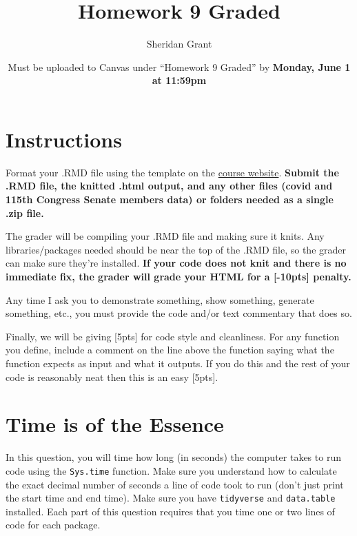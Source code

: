 \documentclass[12pt]{article}
\title{Homework 9 Graded}
\author{Sheridan Grant}
\date{Must be uploaded to Canvas under ``Homework 9 Graded'' by \textbf{Monday, June 1 at 11:59pm}}
\begin{document}
\sloppy

\maketitle

\section*{Instructions}

Format your .RMD file using the template on the \href{https://sheridanlgrant.github.io/teaching/STAT302_SPR2020}{course website}. \textbf{Submit the .RMD file, the knitted .html output, and any other files (covid and 115th Congress Senate members data) or folders needed as a single .zip file.}

The grader will be compiling your .RMD file and making sure it knits. Any libraries/packages needed should be near the top of the .RMD file, so the grader can make sure they're installed. \textbf{If your code does not knit and there is no immediate fix, the grader will grade your HTML for a [-10pts] penalty.}

Any time I ask you to demonstrate something, show something, generate something, etc., you must provide the code and/or text commentary that does so.

Finally, we will be giving [5pts] for code style and cleanliness. For any function you define, include a comment on the line above the function saying what the function expects as input and what it outputs. If you do this and the rest of your code is reasonably neat then this is an easy [5pts].

\section{Time is of the Essence}

In this question, you will time how long (in seconds) the computer takes to run code using the \verb|Sys.time| function. Make sure you understand how to calculate the exact decimal number of seconds a line of code took to run (don't just print the start time and end time). Make sure you have \verb|tidyverse| and \verb|data.table| installed. Each part of this question requires that you time one or two lines of code for each package.
\end{document}
